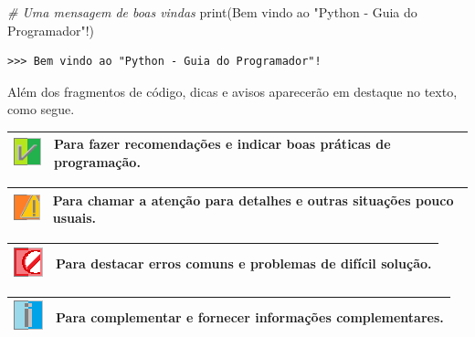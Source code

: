 \documentclass[
]{book}
\newenvironment{Shaded}{\begin{snugshade}}{\end{snugshade}}
\newcommand{\BuiltInTok}[1]{#1}
\newcommand{\CommentTok}[1]{\textcolor[rgb]{0.56,0.35,0.01}{\textit{#1}}}
\newcommand{\NormalTok}[1]{#1}
\newcommand{\StringTok}[1]{\textcolor[rgb]{0.31,0.60,0.02}{#1}}
\begin{document}
\begin{Shaded}
\begin{Highlighting}[]
\CommentTok{\# Uma mensagem de boas vindas}
\BuiltInTok{print}\NormalTok{(}\StringTok{\textquotesingle{}Bem vindo ao "Python {-} Guia do Programador"!\textquotesingle{}}\NormalTok{)}
\end{Highlighting}
\end{Shaded}

\begin{verbatim}
>>> Bem vindo ao "Python - Guia do Programador"!
\end{verbatim}

Além dos fragmentos de código, dicas e avisos aparecerão em destaque no texto, como segue.

\begin{longtable}[]{@{}cl@{}}
\toprule
\includegraphics{images/do.png} & Para fazer recomendações e indicar boas práticas de programação. \\
\midrule
\endhead
\bottomrule
\end{longtable}

\begin{longtable}[]{@{}
  >{\centering\arraybackslash}p{}
  >{\raggedright\arraybackslash}p{}@{}}
\toprule
\includegraphics{images/warn.png} & Para chamar a atenção para detalhes e outras situações pouco usuais. \\
\midrule
\endhead
\bottomrule
\end{longtable}

\begin{longtable}[]{@{}cl@{}}
\toprule
\includegraphics{images/dont.png} & Para destacar erros comuns e problemas de difícil solução. \\
\midrule
\endhead
\bottomrule
\end{longtable}

\begin{longtable}[]{@{}cl@{}}
\toprule
\includegraphics{images/info.png} & Para complementar e fornecer informações complementares. \\
\midrule
\endhead
\bottomrule
\end{longtable}
\end{document}
